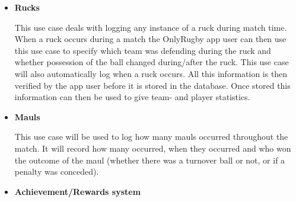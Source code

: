 \documentclass[a4paper,12pt]{report}
\begin{document}
\begin{itemize}
\begin{center}
		\end{center}
	\item \textbf{Rucks}
		\begin{flushleft}
		This use case deals with logging any instance of a ruck during match time. When a ruck occurs during a match the OnlyRugby app user can then use this use case to specify which team was defending during the ruck and whether possession of the ball changed during/after the ruck. This use case will also automatically log when a ruck occurs. All this information is then verified by the app user before it is stored in the database. Once stored this information can then be used to give team- and player statistics.
		\end{flushleft}
		\begin{center}
		\end{center}
	\item \textbf{Mauls}
		\begin{flushleft}
			This use case will be used to log how many mauls occurred throughout the match. It will record how many occurred, when they occurred and who won the outcome of the maul (whether there was a turnover ball or not, or if a penalty was conceded).
		\end{flushleft}
		\begin{center}
		\end{center}
	\item \textbf{Achievement/Rewards system}
		\begin{flushleft}
		\end{flushleft}
\end{itemize}
\end{document}

